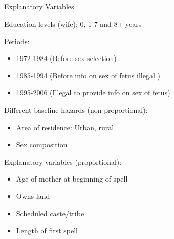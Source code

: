\documentclass[red]{beamer}
\begin{document}
\subsection{}

% 
% 
% 
% 


\begin{frame}{Explanatory Variables}

Education levels (wife): 0, 1-7 and 8+ years
\smallskip

Periods:
\begin{itemize}
    \item 1972-1984 (Before sex selection)
    \item 1985-1994 (Before info on sex of fetus illegal )
    \item 1995-2006 (Illegal to provide info on sex of fetus)
\end{itemize}

\smallskip
Different baseline hazards (non-proportional):
\begin{itemize}
 \item Area of residence: Urban, rural
 \item Sex composition
\end{itemize}
\smallskip
Explanatory variables (proportional):
\begin{itemize}
 \item Age of mother at beginning of spell
 \item Owns land
 \item Scheduled caste/tribe
 \item Length of first spell
\end{itemize}

\end{frame}
\end{document}
